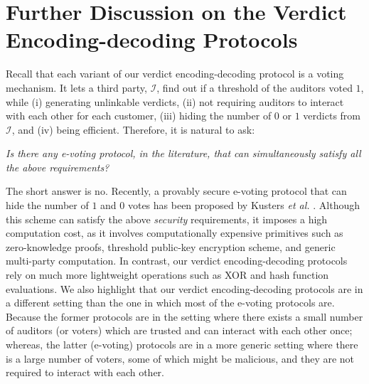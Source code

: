 
\section{Further Discussion on the Verdict Encoding-decoding Protocols}\label{sec:: Further-Discussion-on-the-Encoding-decoding-Protocol}




Recall that each variant of our verdict encoding-decoding protocol is a voting mechanism. It  lets a third party, $\mathcal{I}$, find out if a threshold of the auditors voted $1$, while (i) generating unlinkable verdicts, (ii) not requiring auditors to interact with each other for each customer, (iii) hiding the number of $0$ or $1$ verdicts from  $\mathcal{I}$, and (iv) being  efficient. Therefore, it is natural to ask: 

\begin{center}
\emph{Is there   any {e-voting} protocol, in the literature, that can  simultaneously satisfy all the above requirements?}
\end{center}


The short answer is no. Recently, a provably secure  e-voting protocol that can hide the number of $1$ and $0$ votes has been proposed by K{u}sters \textit{et al.} \cite{KustersL00020}. Although this scheme can satisfy the above \emph{security} requirements, it imposes a high computation cost, as  it involves computationally expensive primitives such as zero-knowledge proofs, threshold public-key encryption scheme, and generic multi-party computation. In contrast, our verdict encoding-decoding protocols rely on much more lightweight operations such as XOR and hash function evaluations.  We also  highlight that our verdict encoding-decoding protocols are in a different setting than the one in which most of the e-voting protocols are. Because the former protocols are in the setting where there exists a small number of auditors (or voters) which are trusted and can interact with each other once; whereas, the latter (e-voting) protocols are in a more   generic setting where there is a large number of  voters, some of which might be malicious, and they are not   required to interact with each other. 


